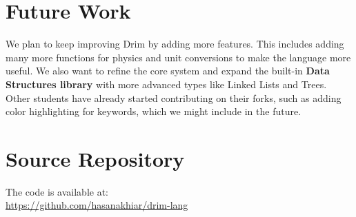 \documentclass[12pt, a4paper]{article}
\begin{document}
\vspace{1cm}

\section{Future Work}
We plan to keep improving Drim by adding more features. This includes adding many more functions for physics and unit conversions to make the language more useful. We also want to refine the core system and expand the built-in \textbf{Data Structures library} with more advanced types like Linked Lists and Trees. Other students have already started contributing on their forks, such as adding color highlighting for keywords, which we might include in the future.

\vspace{1cm}

\section{Source Repository}
The code is available at: \\
\url{https://github.com/hasanakhiar/drim-lang}
\end{document}
